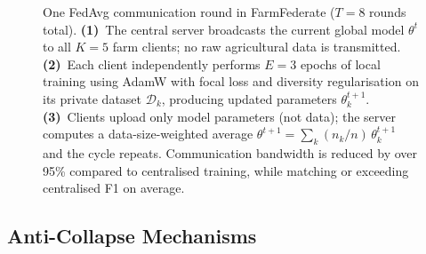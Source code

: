 \documentclass[conference]{IEEEtran}
\begin{document}
\begin{figure}[t]
\caption{One FedAvg communication round in FarmFederate ($T{=}8$ rounds total).
\textbf{(1)}~The central server broadcasts the current global model $\theta^t$
to all $K{=}5$ farm clients; no raw agricultural data is transmitted.
\textbf{(2)}~Each client independently performs $E{=}3$ epochs of local
training using AdamW with focal loss and diversity regularisation on its
private dataset $\mathcal{D}_k$, producing updated parameters $\theta_k^{t+1}$.
\textbf{(3)}~Clients upload only model parameters (not data); the server
computes a data-size-weighted average
$\theta^{t+1}=\sum_k(n_k/n)\,\theta_k^{t+1}$ and the cycle repeats.
Communication bandwidth is reduced by over 95\% compared to centralised
training, while matching or exceeding centralised F1 on average.}
\label{fig:fedavg_loop}
\end{figure}

\subsection{Anti-Collapse Mechanisms}
\end{document}
